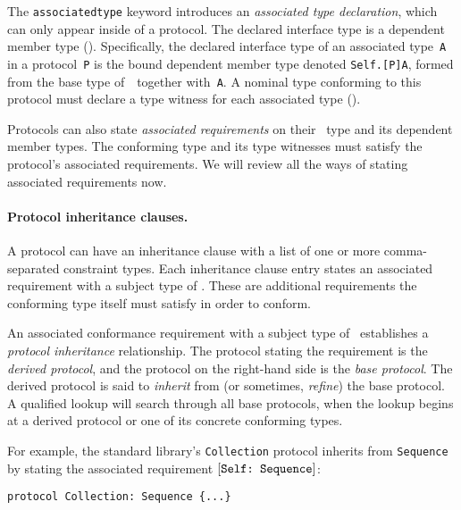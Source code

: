 \documentclass[../generics]{subfiles}
\begin{document}
The \texttt{associatedtype} keyword introduces an \emph{associated type declaration}, which can only appear inside of a protocol. The declared interface type is a dependent member type (). Specifically, the declared interface type of an associated type~\texttt{A} in a protocol~\texttt{P} is the bound dependent member type denoted \texttt{Self.[P]A}, formed from the base type of~\tSelf\ together with~\texttt{A}. A nominal type conforming to this protocol must declare a type witness for each associated type (). 

Protocols can also state \emph{associated requirements} on their \tSelf\ type and its dependent member types. The conforming type and its type witnesses must satisfy the protocol's associated requirements. We will review all the ways of stating associated requirements now.

\paragraph{Protocol inheritance clauses.}
A protocol can have an inheritance clause with a list of one or more comma-separated constraint types. Each inheritance clause entry states an associated requirement with a subject type of \tSelf. These are additional requirements the conforming type itself must satisfy in order to conform.

An associated conformance requirement with a subject type of \tSelf\ establishes a \emph{protocol inheritance} relationship. The protocol stating the requirement is the \emph{derived protocol}, and the protocol on the right-hand side is the \emph{base protocol}. The derived protocol is said to \emph{inherit} from (or sometimes, \emph{refine}) the base protocol. A qualified lookup will search through all base protocols, when the lookup begins at a derived protocol or one of its concrete conforming types.

For example, the standard library's \texttt{Collection} protocol inherits from \texttt{Sequence} by stating the associated requirement $[\texttt{Self:~Sequence}]$:
\begin{Verbatim}
protocol Collection: Sequence {...}
\end{Verbatim}
\end{document}
